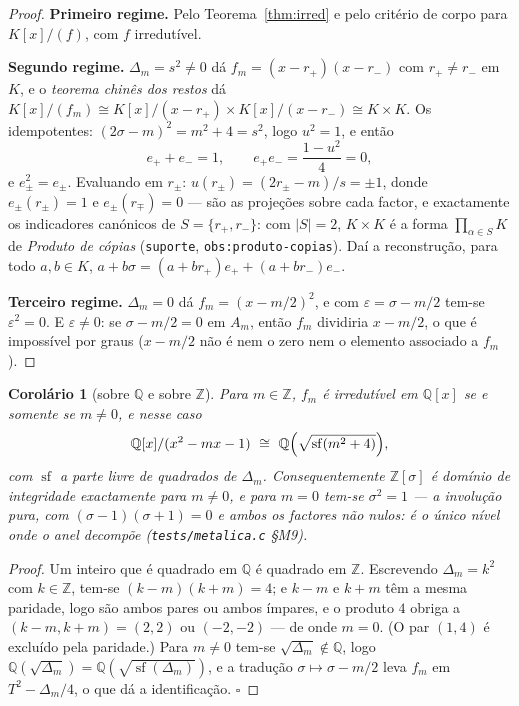 \documentclass[11pt,a4paper]{article}
\newtheorem{corolario}{Corolário}
\newcommand{\code}[1]{\texttt{#1}}
\begin{document}
\begin{proof}
\textbf{Primeiro regime.} Pelo Teorema~\ref{thm:irred} e pelo critério de corpo para
$K[x]/(f)$, com $f$ irredutível.

\textbf{Segundo regime.} $\Delta_m=s^{2}\neq0$ dá $f_m=(x-r_{+})(x-r_{-})$ com
$r_{+}\neq r_{-}$ em $K$, e o \emph{teorema chinês dos restos} dá
$K[x]/(f_m)\cong K[x]/(x-r_{+})\times K[x]/(x-r_{-})\cong K\times K$.
Os idempotentes: $(2\sigma-m)^{2}=m^{2}+4=s^{2}$, logo $u^{2}=1$, e então
\[
e_{+}+e_{-}=1,\qquad
e_{+}e_{-}=\frac{1-u^{2}}{4}=0,
\]
e $e_{\pm}^{2}=e_{\pm}$. Evaluando em $r_{\pm}$: $u(r_{\pm})=(2r_{\pm}-m)/s=\pm1$, donde
$e_{\pm}(r_{\pm})=1$ e $e_{\pm}(r_{\mp})=0$ --- são as projeções sobre cada factor, e
exactamente os indicadores canónicos de $S=\{r_{+},r_{-}\}$: com $|S|=2$,
$K\times K$ é a forma $\prod_{\alpha\in S}K$ de \emph{Produto de cópias}
(\code{suporte}, \code{obs:produto-copias}). Daí a reconstrução, para todo
$a,b\in K$, $a+b\sigma=(a+br_{+})e_{+}+(a+br_{-})e_{-}$.

\textbf{Terceiro regime.} $\Delta_m=0$ dá $f_m=(x-m/2)^{2}$, e com
$\varepsilon=\sigma-m/2$ tem-se $\varepsilon^{2}=0$. E $\varepsilon\neq0$: se
$\sigma-m/2=0$ em $A_m$, então $f_m$ dividiria $x-m/2$, o que é impossível por graus
($x-m/2$ não é nem o zero nem o elemento associado a $f_m$).
\end{proof}

\begin{corolario}[sobre $\mathbb{Q}$ e sobre $\mathbb{Z}$]\label{cor:metal-q}
Para $m\in\mathbb{Z}$, $f_m$ é irredutível em $\mathbb{Q}[x]$ \emph{se e somente se}
$m\neq0$, e nesse caso
\[
\mathbb{Q}[x]/(x^{2}-mx-1)\ \cong\ \mathbb{Q}\Bigl(\sqrt{\operatorname{sf}(m^{2}+4)}\Bigr),
\]
com $\operatorname{sf}$ a parte livre de quadrados de $\Delta_m$. Consequentemente
$\mathbb{Z}[\sigma]$ é domínio de integridade exactamente para $m\neq0$, e para $m=0$
tem-se $\sigma^{2}=1$ --- a involução pura, com $(\sigma-1)(\sigma+1)=0$ e ambos os
factores não nulos: é o único nível onde o anel decompõe (\code{tests/metalica.c} §M9).
\end{corolario}

\begin{proof}
Um inteiro que é quadrado em $\mathbb{Q}$ é quadrado em $\mathbb{Z}$. Escrevendo
$\Delta_m=k^{2}$ com $k\in\mathbb{Z}$, tem-se $(k-m)(k+m)=4$; e $k-m$ e $k+m$ têm a mesma
paridade, logo são ambos pares ou ambos ímpares, e o produto $4$ obriga a
$(k-m,k+m)=(2,2)$ ou $(-2,-2)$ --- de onde $m=0$. (O par $(1,4)$ é excluído pela
paridade.) Para $m\neq0$ tem-se $\sqrt{\Delta_m}\notin\mathbb{Q}$, logo
$\mathbb{Q}(\sqrt{\Delta_m})=\mathbb{Q}(\sqrt{\operatorname{sf}(\Delta_m)})$, e a
tradução $\sigma\mapsto\sigma-m/2$ leva $f_m$ em $T^{2}-\Delta_m/4$, o que dá a
identificação. $\square$
\end{proof}
\end{document}
